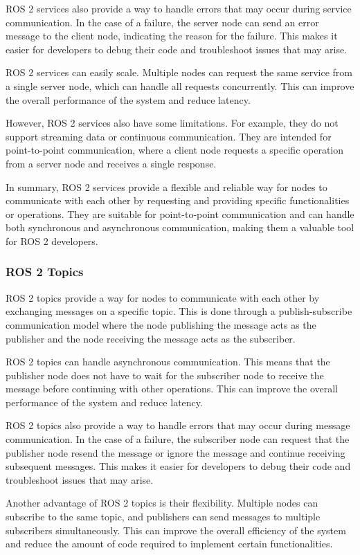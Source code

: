 \documentclass[12pt,oneside]{article}
\begin{document}
ROS 2 services also provide a way to handle errors that may occur during service communication. In the case of a failure, the server node can send an error message to the client node, indicating the reason for the failure. This makes it easier for developers to debug their code and troubleshoot issues that may arise.

ROS 2 services can easily scale. Multiple nodes can request the same service from a single server node, which can handle all requests concurrently. This can improve the overall performance of the system and reduce latency.

However, ROS 2 services also have some limitations. For example, they do not support streaming data or continuous communication. They are intended for point-to-point communication, where a client node requests a specific operation from a server node and receives a single response.

In summary, ROS 2 services provide a flexible and reliable way for nodes to communicate with each other by requesting and providing specific functionalities or operations. They are suitable for point-to-point communication and can handle both synchronous and asynchronous communication, making them a valuable tool for ROS 2 developers.

\subsubsection{ROS 2 Topics}\label{ros2-topics}
ROS 2 topics provide a way for nodes to communicate with each other by exchanging messages on a specific topic. This is done through a publish-subscribe communication model where the node publishing the message acts as the publisher and the node receiving the message acts as the subscriber.

ROS 2 topics can handle asynchronous communication. This means that the publisher node does not have to wait for the subscriber node to receive the message before continuing with other operations. This can improve the overall performance of the system and reduce latency.

ROS 2 topics also provide a way to handle errors that may occur during message communication. In the case of a failure, the subscriber node can request that the publisher node resend the message or ignore the message and continue receiving subsequent messages. This makes it easier for developers to debug their code and troubleshoot issues that may arise.

Another advantage of ROS 2 topics is their flexibility. Multiple nodes can subscribe to the same topic, and publishers can send messages to multiple subscribers simultaneously. This can improve the overall efficiency of the system and reduce the amount of code required to implement certain functionalities.
\end{document}
